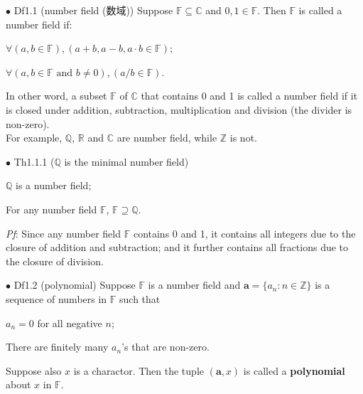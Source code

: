 \documentclass{article}
\begin{document}
\begin{Df}{$\bullet$ Df1.1 (number field (数域))}
    Suppose $\mathbb{F}\subseteq\mathbb{C}$ and $0,1\in\mathbb{F}$. Then $\mathbb{F}$ is called a number field if:
    \begin{compactenum}
        \item $\forall (a,b\in \mathbb{F}), (a+b, a-b, a\cdot b \in \mathbb{F})$;
        \item $\forall (a,b\in \mathbb{F} \text{ and } b\neq 0), (a/b\in \mathbb{F})$.
    \end{compactenum}
\end{Df}

\begin{Rmk}{}
    In other word, a subset $\mathbb{F}$ of $\mathbb{C}$ that contains 0 and 1 is called a number field if it is closed under addition, subtraction, multiplication and division (the divider is non-zero).\\
    \textcolor{Th}{For example, $\mathbb{Q}$, $\mathbb{R}$ and $\mathbb{C}$ are number field, while $\mathbb{Z}$ is not.}
\end{Rmk}

\begin{Th}{$\bullet$ Th1.1.1 ($\mathbb{Q}$ is the minimal number field)}
    \begin{compactenum}
        \item $\mathbb{Q}$ is a number field;
        \item For any number field $\mathbb{F}$, $\mathbb{F}\supseteq\mathbb{Q}$.
    \end{compactenum}
    \tcblower
    \textit{Pf}: Since any number field $\mathbb{F}$ contains 0 and 1, it contains all integers due to the closure of addition and subtraction; and it further contains all fractions due to the closure of division.
\end{Th}

\begin{Df}{$\bullet$ Df1.2 (polynomial)}
    Suppose $\mathbb{F}$ is a number field and $\pmb{a} = \{a_n: n\in\mathbb{Z}\}$ is a sequence of numbers in $\mathbb{F}$ such that
    \begin{compactenum}
        \item $a_n = 0$ for all negative $n$;
        \item There are finitely many $a_n$'s that are non-zero.
    \end{compactenum}
    Suppose also $x$ is a charactor. Then the tuple $(\pmb{a}, x)$ is called a \textbf{polynomial} about $x$ in $\mathbb{F}$.
\end{Df}
\end{document}
